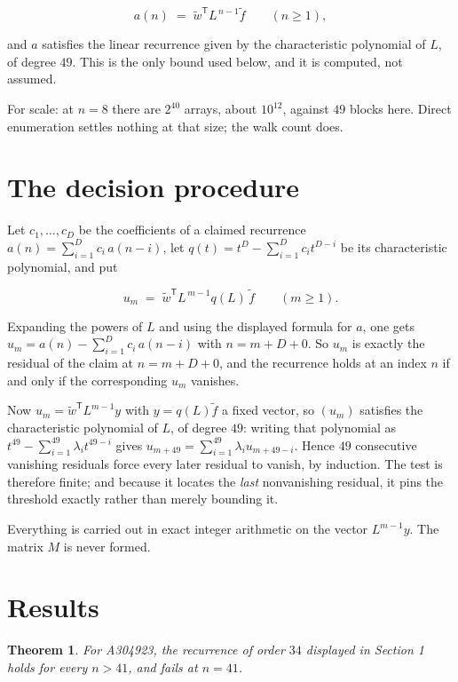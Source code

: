 \documentclass[11pt]{article}
\newtheorem{theorem}{Theorem}
\theoremstyle{definition}
\begin{document}
\[a(n) \;=\; \tilde w^{\mathsf T} L^{\,n-1} \tilde f \qquad (n \ge 1),\]

and $a$ satisfies the linear recurrence given by the characteristic polynomial of $L$, of degree $49$. This is the only bound used below, and it is computed, not assumed.

For scale: at $n = 8$ there are $2^{40}$ arrays, about $10^{12}$, against $49$ blocks here. Direct enumeration settles nothing at that size; the walk count does.

\section{The decision procedure}

Let $c_1,\dots,c_D$ be the coefficients of a claimed recurrence $a(n) = \sum_{i=1}^{D} c_i\,a(n-i)$, let $q(t) = t^{D} - \sum_{i=1}^{D} c_i t^{D-i}$ be its characteristic polynomial, and put

\[u_m \;=\; \tilde w^{\mathsf T} L^{\,m-1} q(L)\,\tilde f \qquad (m \ge 1).\]

Expanding the powers of $L$ and using the displayed formula for $a$, one gets $u_m = a(n) - \sum_{i=1}^{D} c_i\,a(n-i)$ with $n = m + D + 0$. So $u_m$ is exactly the residual of the claim at $n = m + D + 0$, and the recurrence holds at an index $n$ if and only if the corresponding $u_m$ vanishes.

Now $u_m = \tilde w^{\mathsf T} L^{m-1} y$ with $y = q(L)\tilde f$ a fixed vector, so $(u_m)$ satisfies the characteristic polynomial of $L$, of degree $49$: writing that polynomial as $t^{49} - \sum_{i=1}^{49} \lambda_i t^{49-i}$ gives $u_{m+49} = \sum_{i=1}^{49} \lambda_i u_{m+49-i}$. Hence $49$ consecutive vanishing residuals force every later residual to vanish, by induction. The test is therefore finite; and because it locates the {\itshape last} nonvanishing residual, it pins the threshold exactly rather than merely bounding it.

Everything is carried out in exact integer arithmetic on the vector $L^{m-1}y$. The matrix $M$ is never formed.

\section{Results}

\begin{theorem} For A304923, the recurrence of order $34$ displayed in Section 1 holds for every $n > 41$, and fails at $n = 41$.\end{theorem}
\end{document}
